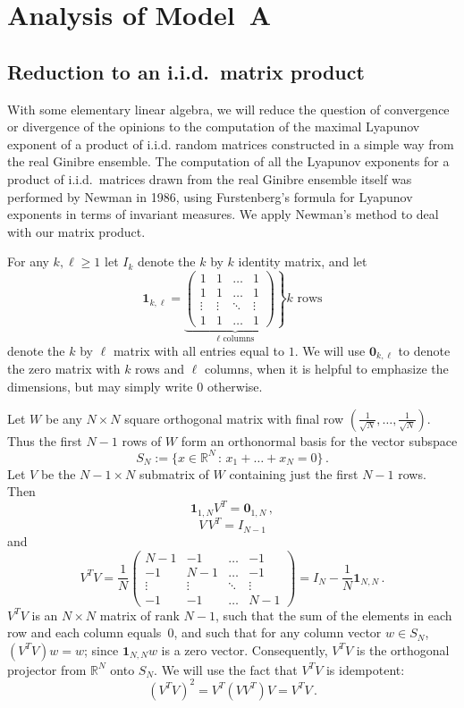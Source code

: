 \documentclass[12pt]{article}
\newcommand{\1}{\mathbf{1}}
\begin{document}
\section{Analysis of Model~A}\label{S: analysis of model A}
\subsection{Reduction to an i.i.d.~matrix product}\label{Sec 2.1}
 With some elementary linear algebra, we will reduce the question of convergence or divergence of the opinions to the computation of the maximal Lyapunov exponent of a product of i.i.d. random matrices constructed in a simple way from the real Ginibre ensemble.  The computation of all the Lyapunov exponents for a product of i.i.d.\ matrices drawn from the real Ginibre ensemble itself was performed by Newman \cite{Newman} in 1986, using Furstenberg's formula for Lyapunov exponents in terms of invariant measures. We apply Newman's method to deal with our matrix product. 

For any $k, \ell \ge 1$ let $I_k$ denote the $k$ by $k$ identity matrix, and let 
$$
\mathbf{1}_{k,\ell}=
\underbrace{
\left.
\begin{pmatrix}
    1 & 1& \dots &1 \\
    1 & 1& \dots &1 \\
    \vdots & \vdots& \ddots &\vdots \\
    1 & 1& \dots &1 
\end{pmatrix}
\right\}}
_{\text{$\ell$ columns}}
\text{$k$ rows}
$$
denote the $k$ by $\ell$ matrix with all entries equal to $1$. We will use $\mathbf{0}_{k,\ell}$ to denote the zero matrix with $k$ rows and $\ell$ columns, when it is helpful to emphasize the dimensions, but may simply write $0$ otherwise.

Let $W$ be any $N\times N$ square orthogonal matrix with final row  $\left(\frac{1}{\sqrt{N}}, \dots, \frac{1}{\sqrt{N}}\right)$. Thus the first $N-1$ rows of $W$ form an orthonormal basis for the vector subspace 
$$
S_N:=\{x \in \mathbb{R}^N \,:\, x_1 + \dots + x_N = 0\}\,.
$$ 
Let $V$ be the $N-1\times N$ submatrix of $W$ containing just the first $N-1$ rows. Then
$$ \mathbf{1}_{1,N} V^T = \mathbf{0}_{1,N}\,,$$
$$ 
V\,V^T = I_{N-1} 
$$
and 
$$
V^T V=
\frac1{N}\begin{pmatrix}
    N-1 & -1& \dots &-1 \\
    -1 & N-1& \dots &-1 \\
    \vdots & \vdots& \ddots &\vdots \\
    -1 & -1& \dots &N-1
\end{pmatrix}
=I_N-\frac1{N} \mathbf{1}_{N,N}\,.
$$
$V^TV$ is an $N\times N$ matrix of rank $N-1$, such that the sum of the elements in each row and each column equals~$0$, and such that for any column vector $w \in S_N$, $(V^T V) w = w$; since $ \mathbf{1}_{N,N} w$ is a zero vector. Consequently,  $V^T V$ is the orthogonal projector from $\mathbb{R}^N$ onto $S_N$. We will use the fact that $V^T V$ is idempotent: $$\left(V^T V\right)^2 = V^T(VV^T)V = V^T V\,.$$
\end{document}
